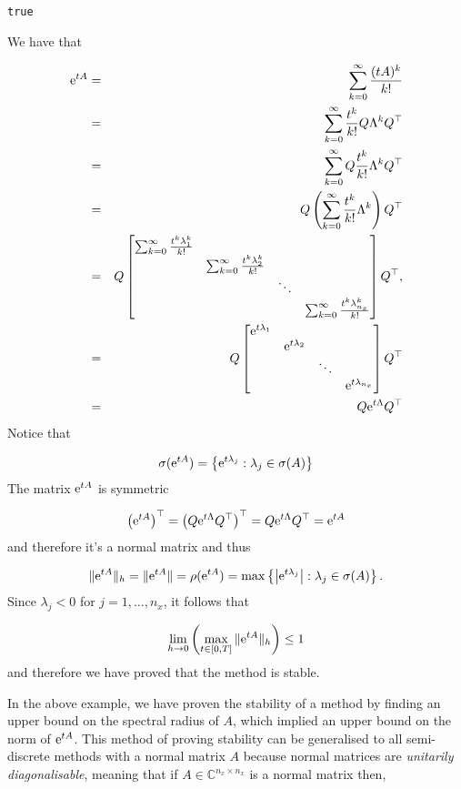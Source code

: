 \documentclass[12pt,landscape]{article}
\begin{document}
{\begin{lstlisting}
true
\end{lstlisting}


We have that


\begin{eqnarray*}
{\rm e}^{tA} &=& \sum_{k = 0}^{\infty} \frac{(tA)^k}{k!} \\
&=& \sum_{k = 0}^{\infty}\frac{t^k}{k!} Q \Lambda^k Q^{\top} \\
&=& \sum_{k = 0}^{\infty} Q \frac{t^k}{k!}\Lambda^k Q^{\top} \\
&=& Q \left(\sum_{k = 0}^{\infty}  \frac{t^k}{k!}\Lambda^k\right) Q^{\top} \\
&=&  Q
\begin{bmatrix}
\sum_{k = 0}^{\infty}  \frac{t^k\lambda_1^k}{k!} & & & \\
& \sum_{k = 0}^{\infty}  \frac{t^k\lambda_2^k}{k!} & & \\
 & & \ddots &  \\
&  & & \sum_{k = 0}^{\infty}  \frac{t^k\lambda_{n_x}^k}{k!}
\end{bmatrix} Q^{\top}, \\
&=&  Q
\begin{bmatrix}
 {\rm e}^{t\lambda_1}& & & \\
& {\rm e}^{t\lambda_2} & & \\
 & & \ddots &  \\
&  & & {\rm e}^{t\lambda_{n_x}}
\end{bmatrix} Q^{\top} \\
&=& Q{\rm e}^{t\Lambda}Q^{\top}
\end{eqnarray*}
Notice that

\[
\sigma({\rm e}^{tA}) = \left\lbrace {\rm e}^{t\lambda_j} : \lambda_j \in \sigma(A)   \right\rbrace
\]
The matrix ${\rm e}^{tA}$ is symmetric

\[
\left({\rm e}^{tA}\right)^{\top} = \left(Q{\rm e}^{t\Lambda}Q^{\top}\right)^{\top} = Q{\rm e}^{t\Lambda}Q^{\top} = {\rm e}^{tA}
\]
and therefore it's a normal matrix and thus

\[
\| {\rm e}^{tA} \|_h = \| {\rm e}^{tA} \| = \rho({\rm e}^{tA}) = \max \left\lbrace \left\vert {\rm e}^{t\lambda_j} \right\vert : \lambda_j \in \sigma(A)   \right\rbrace.
\]
Since $\lambda_j < 0$ for $j = 1, \ldots, n_x$, it follows that

\[
\lim_{h \to 0}\left(\max_{t \in [0, T]}\| {\rm e}^{tA}\|_h \right) \leq 1
\]
and therefore we have proved that the method is stable.

In the above example, we have proven the stability of a method by finding an upper bound on the spectral radius of $A$, which implied an upper bound on the norm of ${\rm e}^{tA}$.  This method of proving stability can be generalised to all semi-discrete methods with a normal matrix $A$ because normal matrices are \emph{unitarily diagonalisable}, meaning that if $A \in \mathbb{C}^{n_x \times n_x}$ is a normal matrix then,

}
\end{document}
